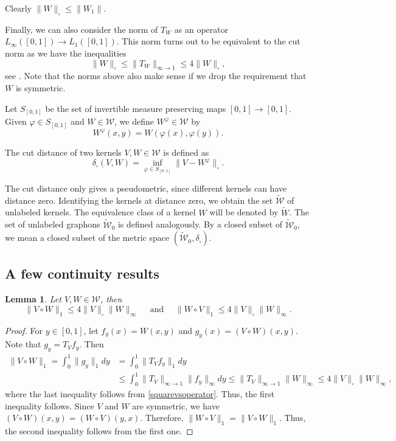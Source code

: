 \documentclass[11pt,a4paper]{article}
\theoremstyle{plain}
\newtheorem{lemma}[theorem]{Lemma}
\theoremstyle{definition}
\begin{document}
Clearly $\|W\|_\square\le \|W_1\|$. 

Finally, we can also consider the norm of $T_W$ as an operator $L_{\infty}([0,1])\to L_1([0,1])$. This norm turns out to be equivalent to the cut norm as we have the inequalities
\begin{equation}\label{squarevsoperator}\|W\|_\square\le \|T_W\|_{\infty\to 1} \le 4\|W\|_\square,
\end{equation}
see \cite[Lemma 8.11]{lovasz2012large}. Note that the norms above also make sense if we drop the requirement that $W$ is symmetric.



Let $S_{[0,1]}$ be the set of invertible measure preserving maps $[0,1]\to [0,1]$. Given $\varphi\in S_{[0,1]}$ and $W\in \mathcal{W}$, we define $W^\varphi\in \mathcal{W}$ by
\[W^{\varphi}(x,y)=W(\varphi(x),\varphi(y)).\]

The cut distance of two kernels $V,W\in \mathcal{W}$ is defined as
\[\delta_\square(V,W)=\inf_{\varphi\in S_{[0,1]}} \|V-W^\varphi\|_\square.\]

The cut distance only gives a pseudometric, since different kernels can have distance zero. Identifying the kernels at distance zero, we obtain the set $\widetilde{\mathcal{W}}$ of unlabeled kernels. The equivalence class of a kernel $W$ will be denoted by $\widetilde{W}$. The set of unlabeled graphons $\widetilde{\mathcal{W}}_0$ is defined analogously. By a closed subset of $\widetilde{\mathcal{W}}_0$, we mean a closed subset of the metric space $(\widetilde{\mathcal{W}}_0,\delta_\square)$.


\subsection{A few continuity results}

\begin{lemma}\label{normofproduct}
Let $V,W\in\mathcal{W}$, then
\[\|V\circ W\|_1\le 4\|V\|_
\square \|W\|_{\infty}\quad\text{ and }\quad\|W\circ V\|_1\le 4\|V\|_
\square \|W\|_{\infty}.\]
\end{lemma}
\begin{proof}
For $y\in[0,1]$, let  $f_{y}(x)=W(x,y)$ and $g_y(x)=(V\circ W)(x,y)$. Note that $g_y=T_V f_y$. Then
\begin{align*}\|V\circ W\|_1=\int_0^1 \|g_y\|_1 dy&=\int_0^1 \|T_V f_y\|_1dy \\&\le \int_0^1 \|T_V\|_{\infty \to 1 } \|f_y\|_{\infty} dy\le \|T_V\|_{\infty \to 1 }\|W\|_{\infty}\le 4\|V\|_
\square \|W\|_{\infty},\end{align*}
where the last inequality follows from \eqref{squarevsoperator}. Thus, the first inequality follows.  Since $V$ and $W$ are symmetric, we have $(V\circ W)(x,y)=(W\circ V)(y,x)$. Therefore, $\|W\circ V\|_1=\|V\circ W\|_1$. Thus, the second inequality follows from the first one.
\end{proof}
\end{document}
